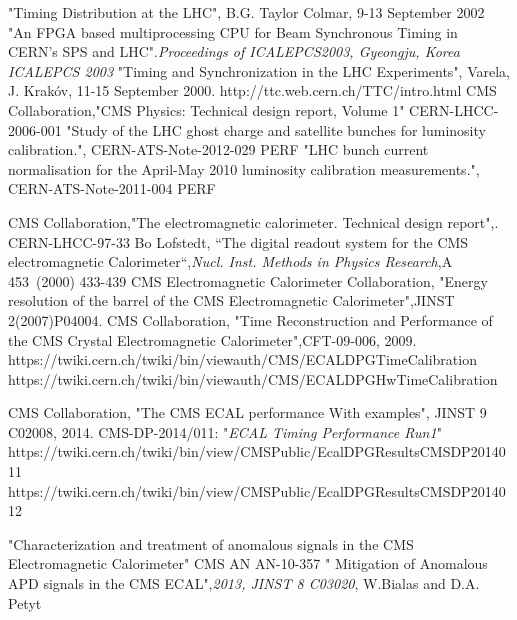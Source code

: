 \begin{thebibliography}{9}
 "Timing Distribution at the LHC",  B.G. Taylor Colmar, 9-13 September 2002
 "An FPGA based multiprocessing CPU for Beam
Synchronous Timing in CERN’s SPS and LHC".\emph{Proceedings of ICALEPCS2003, Gyeongju, Korea
ICALEPCS 2003}
 "Timing and Synchronization in the LHC Experiments", Varela, J. Krakóv, 11-15 September 2000.
 http://ttc.web.cern.ch/TTC/intro.html
CMS Collaboration,"CMS Physics: Technical design report, Volume 1" CERN-LHCC-2006-001
 "Study of the LHC ghost charge and
satellite bunches for luminosity calibration.", CERN-ATS-Note-2012-029 PERF
 "LHC bunch current normalisation for the April-May 2010 luminosity calibration measurements.", CERN-ATS-Note-2011-004 PERF

CMS Collaboration,"The electromagnetic calorimeter. Technical design report",. CERN-LHCC-97-33
 Bo Lofstedt, ``The digital readout system for the CMS electromagnetic Calorimeter``,\textit{Nucl. Inst.  Methods in Physics Research},A 453~(2000) 433-439
CMS Electromagnetic Calorimeter Collaboration, "Energy resolution of the barrel of the CMS Electromagnetic Calorimeter",JINST 2(2007)P04004.
CMS Collaboration, "Time Reconstruction and Performance of the CMS Crystal Electromagnetic Calorimeter",CFT-09-006, 2009.
 https://twiki.cern.ch/twiki/bin/viewauth/CMS/ECALDPGTimeCalibration
https://twiki.cern.ch/twiki/bin/viewauth/CMS/ECALDPGHwTimeCalibration

CMS Collaboration, "The CMS ECAL performance With examples", JINST 9 C02008, 2014.
 CMS-DP-2014/011: "\textit{ECAL Timing Performance Run1}"
 https://twiki.cern.ch/twiki/bin/view/CMSPublic/EcalDPGResultsCMSDP2014011
https://twiki.cern.ch/twiki/bin/view/CMSPublic/EcalDPGResultsCMSDP2014012


 "Characterization and treatment of anomalous signals in the CMS Electromagnetic Calorimeter" CMS AN AN-10-357
 " Mitigation of Anomalous APD signals in the CMS ECAL",\textit{2013, JINST 8 C03020}, W.Bialas and D.A. Petyt


\end{thebibliography}
